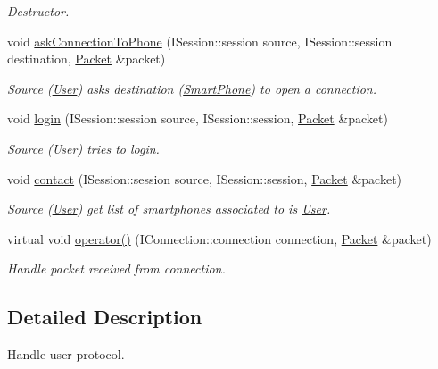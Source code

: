 \begin{DoxyCompactItemize}
\begin{DoxyCompactList}\small\item\em Destructor. \end{DoxyCompactList}\item 
void \hyperlink{class_user_protocol_a1a1e21ce4ee558677f4199137c82d854}{ask\-Connection\-To\-Phone} (I\-Session\-::session source, I\-Session\-::session destination, \hyperlink{class_packet}{Packet} \&packet)
\begin{DoxyCompactList}\small\item\em Source (\hyperlink{struct_user}{User}) asks destination (\hyperlink{struct_smart_phone}{Smart\-Phone}) to open a connection. \end{DoxyCompactList}\item 
void \hyperlink{class_user_protocol_ad63fe50c1e862fe5b76c59a74e2f5ec3}{login} (I\-Session\-::session source, I\-Session\-::session, \hyperlink{class_packet}{Packet} \&packet)
\begin{DoxyCompactList}\small\item\em Source (\hyperlink{struct_user}{User}) tries to login. \end{DoxyCompactList}\item 
void \hyperlink{class_user_protocol_ab9e47090e000f99549b4709b884f7b0c}{contact} (I\-Session\-::session source, I\-Session\-::session, \hyperlink{class_packet}{Packet} \&packet)
\begin{DoxyCompactList}\small\item\em Source (\hyperlink{struct_user}{User}) get list of smartphones associated to is \hyperlink{struct_user}{User}. \end{DoxyCompactList}\item 
virtual void \hyperlink{class_user_protocol_ace2c056bac47892fa8c30f9c8d820204}{operator()} (I\-Connection\-::connection connection, \hyperlink{class_packet}{Packet} \&packet)
\begin{DoxyCompactList}\small\item\em Handle packet received from connection. \end{DoxyCompactList}\end{DoxyCompactItemize}


\subsection{Detailed Description}
Handle user protocol. 

